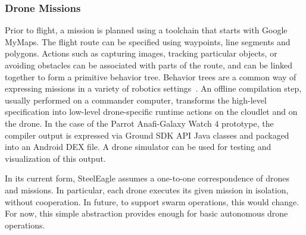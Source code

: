 \subsubsection{Drone Missions}
Prior to flight, a mission is planned using a toolchain that starts with Google MyMaps. The flight route can be specified using waypoints, line segments and polygons. Actions such as capturing images, tracking particular objects, or avoiding obstacles can be associated with parts of the route, and can be linked together to form a primitive behavior tree. Behavior trees are a common way of expressing missions in a variety of robotics settings~\cite{Ghouzli2023}. An offline compilation step, usually performed on a commander computer, transforms the high-level specification into low-level drone-specific runtime actions on the cloudlet and on the drone.  In the case of the Parrot Anafi-Galaxy Watch 4 prototype, the compiler output is expressed via Ground SDK API Java classes and packaged into an Android DEX file. A drone simulator can be used for testing and visualization of this output. 

In its current form, SteelEagle assumes a one-to-one correspondence of drones and missions. In particular, each drone executes its given mission in isolation, without cooperation. In future, to support swarm operations, this would change. For now, this simple abstraction provides enough for basic autonomous drone operations.

